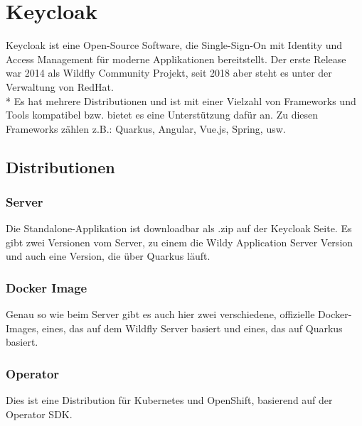 \pagebreak
\section{Keycloak}
\author{Benjamin Besic}
Keycloak ist eine Open-Source Software, die Single-Sign-On mit Identity und Access Management für moderne Applikationen bereitstellt. Der erste Release war 2014 als Wildfly Community Projekt, seit 2018 aber steht es unter der Verwaltung von RedHat. \cite{KeycloakWiki}  \\* 
Es hat mehrere Distributionen und ist mit einer Vielzahl von Frameworks und Tools kompatibel bzw. bietet es eine Unterstützung dafür an. Zu diesen Frameworks zählen z.B.: Quarkus, Angular, Vue.js, Spring, usw. \cite{KeyCloakDZone}

\subsection{Distributionen}
\subsubsection{Server}
Die Standalone-Applikation ist downloadbar als .zip auf der Keycloak Seite. Es gibt zwei Versionen vom Server, zu einem die Wildy Application Server Version und auch eine Version, die über Quarkus läuft.
\subsubsection{Docker Image}
Genau so wie beim Server gibt es auch hier zwei verschiedene, offizielle Docker-Images, eines, das auf dem Wildfly Server basiert und eines, das auf Quarkus basiert.
\subsubsection{Operator}
Dies ist eine Distribution für Kubernetes und OpenShift, basierend auf der Operator SDK. \cite{KeyCloakDZone}
